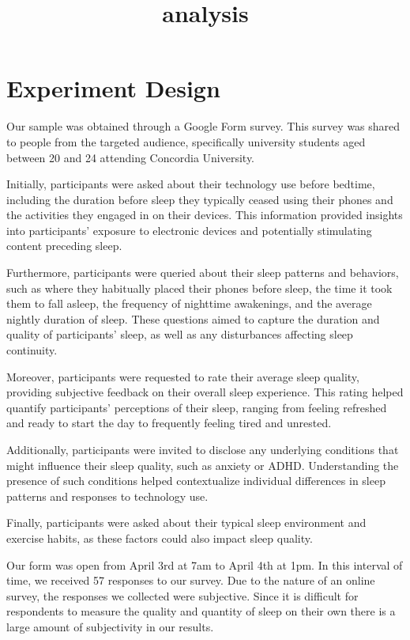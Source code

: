 \documentclass[11pt]{article}
\title{analysis}
\begin{document}
    
    \maketitle
    
    

    
    \hypertarget{experiment-design}{%
\section{Experiment Design}\label{experiment-design}}

Our sample was obtained through a Google Form survey. This survey was
shared to people from the targeted audience, specifically university
students aged between 20 and 24 attending Concordia University.

Initially, participants were asked about their technology use before
bedtime, including the duration before sleep they typically ceased using
their phones and the activities they engaged in on their devices. This
information provided insights into participants' exposure to electronic
devices and potentially stimulating content preceding sleep.

Furthermore, participants were queried about their sleep patterns and
behaviors, such as where they habitually placed their phones before
sleep, the time it took them to fall asleep, the frequency of nighttime
awakenings, and the average nightly duration of sleep. These questions
aimed to capture the duration and quality of participants' sleep, as
well as any disturbances affecting sleep continuity.

Moreover, participants were requested to rate their average sleep
quality, providing subjective feedback on their overall sleep
experience. This rating helped quantify participants' perceptions of
their sleep, ranging from feeling refreshed and ready to start the day
to frequently feeling tired and unrested.

Additionally, participants were invited to disclose any underlying
conditions that might influence their sleep quality, such as anxiety or
ADHD. Understanding the presence of such conditions helped contextualize
individual differences in sleep patterns and responses to technology
use.

Finally, participants were asked about their typical sleep environment
and exercise habits, as these factors could also impact sleep quality.

Our form was open from April 3rd at 7am to April 4th at 1pm. In this
interval of time, we received 57 responses to our survey. Due to the
nature of an online survey, the responses we collected were subjective.
Since it is difficult for respondents to measure the quality and
quantity of sleep on their own there is a large amount of subjectivity
in our results.
\end{document}
